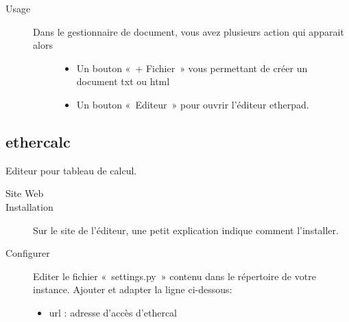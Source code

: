 \documentclass[a4paper,10pt,oneside,french]{sphinxmanual}
\begin{document}
\begin{sphinxVerbatim}[commandchars=\\\{\}]
     
\end{sphinxVerbatim}
\begin{description}
\item[{Usage}] \leavevmode\begin{description}
\item[{Dans le gestionnaire de document, vous avez plusieurs action qui apparait alors}] \leavevmode\begin{itemize}
\item {} 
Un bouton « + Fichier » vous permettant de créer un document txt ou html

\item {} 
Un bouton « Editeur » pour ouvrir l’éditeur etherpad.

\end{itemize}

\end{description}

\end{description}

\noindent{}


\subsection{ethercalc}
\label{\detokenize{documents/editor:ethercalc}}
Editeur pour tableau de calcul.
\begin{description}
\item[{Site Web}] \leavevmode
{}

\item[{Installation}] \leavevmode
Sur le site de l’éditeur, une petit explication indique comment l’installer.

\item[{Configurer}] \leavevmode
Editer le fichier « settings.py » contenu dans le répertoire de votre instance.
Ajouter et adapter la ligne ci-dessous:
\begin{itemize}
\item {} 
url : adresse d’accès d’ethercal

\end{itemize}

\end{description}
\end{document}
